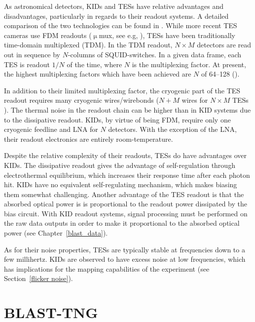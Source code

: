 As astronomical detectors, KIDs and TESs have relative advantages and disadvantages, particularly in regards to their readout systems. A detailed comparison of the two technologies can be found in \citet{mauskopf2018transition}. While more recent TES cameras use FDM readouts ($\upmu$mux, see e.g, \citet{stanchfield2016development}), TESs have been traditionally time-domain multiplexed (TDM). In the TDM readout, $N \times M$ detectors are read out in sequence by $N$-columns of SQUID-switches. In a given data frame, each TES is readout $1/N$ of the time, where $N$ is the multiplexing factor. At present, the highest multiplexing factors which have been achieved are $N$ of 64--128 (\citet{henderson2016advanced,mates2017simultaneous}).

In addition to their limited multiplexing factor, the cryogenic part of the TES readout requires many cryogenic wires/wirebonds ($N + M$ wires for $N \times M$ TESs \citep{mauskopf2018transition}). The thermal noise in the readout chain can be higher than in KID systems due to the dissipative readout. KIDs, by virtue of being FDM, require only one cryogenic feedline and LNA for $N$ detectors. With the exception of the LNA, their readout electronics are entirely room-temperature.

Despite the relative complexity of their readouts, TESs do have advantages over KIDs. The dissipative readout gives the advantage of self-regulation through electrothermal equilibrium, which increases their response time after each photon hit. KIDs have no equivalent self-regulating mechanism, which makes biasing them somewhat challenging. Another advantage of the TES readout is that the absorbed optical power is is proportional to the readout power dissipated by the bias circuit. With KID readout systems, signal processing must be performed on the raw data outputs in order to make it proportional to the absorbed optical power (see Chapter~\ref{blast_data}).

As for their noise properties, TESs are typically stable at frequencies down to a few millihertz. KIDs are observed to have excess noise at low frequencies, which has implications for the mapping capabilities of the experiment (see Section~\ref{flicker noise}).

\section{BLAST-TNG}\label{blast}

